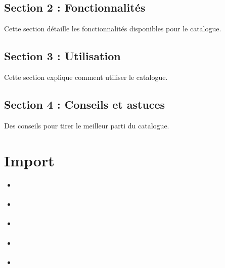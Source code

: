 \documentclass[letterpaper,10pt,french]{sphinxmanual}
\begin{document}
\subsection{Section 2 : Fonctionnalités}
\label{\detokenize{doc_user/services:section-2-fonctionnalites}}
\sphinxAtStartPar
Cette section détaille les fonctionnalités disponibles pour le catalogue.


\subsection{Section 3 : Utilisation}
\label{\detokenize{doc_user/services:section-3-utilisation}}
\sphinxAtStartPar
Cette section explique comment utiliser le catalogue.


\subsection{Section 4 : Conseils et astuces}
\label{\detokenize{doc_user/services:section-4-conseils-et-astuces}}
\sphinxAtStartPar
Des conseils pour tirer le meilleur parti du catalogue.

\sphinxstepscope


\section{Import}
\label{\detokenize{doc_user/import:import}}\label{\detokenize{doc_user/import::doc}}
\begin{sphinxShadowBox}
\begin{itemize}
\item {} 
\sphinxAtStartPar
{}\label{\detokenize{doc_user/import:id1}}{\hyperref[\detokenize{doc_user/import:introduction}]{}}

\item {} 
\sphinxAtStartPar
{}\label{\detokenize{doc_user/import:id2}}{\hyperref[\detokenize{doc_user/import:section-1-description}]{}}

\item {} 
\sphinxAtStartPar
{}\label{\detokenize{doc_user/import:id3}}{\hyperref[\detokenize{doc_user/import:section-2-fonctionnalites}]{}}

\item {} 
\sphinxAtStartPar
{}\label{\detokenize{doc_user/import:id4}}{\hyperref[\detokenize{doc_user/import:section-3-utilisation}]{}}

\item {} 
\sphinxAtStartPar
{}\label{\detokenize{doc_user/import:id5}}{\hyperref[\detokenize{doc_user/import:section-4-conseils-et-astuces}]{}}

\end{itemize}
\end{sphinxShadowBox}
\end{document}
